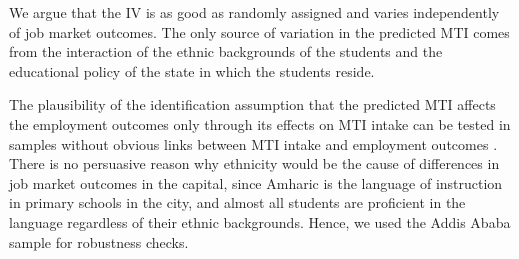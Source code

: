 We argue that the IV is as good as randomly assigned and varies independently of job market outcomes. The only source of variation in the predicted MTI comes from the interaction of the ethnic backgrounds of the students and the educational policy of the state in which the students reside. 

The plausibility of the identification assumption that the predicted MTI affects the employment outcomes only through its effects on MTI intake can be tested in samples without obvious links between MTI intake and employment outcomes \citep{Angrist1990}. There is no persuasive reason why ethnicity would be the cause of differences in job market outcomes in the capital, since Amharic is the language of instruction in primary schools in the city, and almost all students are proficient in the language regardless of their ethnic backgrounds. Hence, we used the Addis Ababa sample for robustness checks.






























